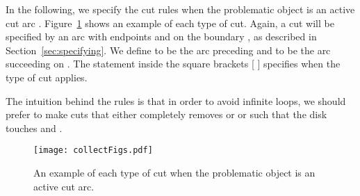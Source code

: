 \documentclass{article}
\begin{document}
In the following, we specify the cut rules when the problematic object is an active cut arc .
Figure~\ref{fig:cuttypesActive} shows an example of each type of cut.
Again, a cut will be specified by an arc  with endpoints  and  on the boundary , as described in Section~\ref{sec:specifying}.
We define  to be the arc preceding  and  to be the arc succeeding  on .
The statement inside the square brackets [ ] specifies when the type of cut applies.

The intuition behind the rules is that in order to avoid infinite loops, we should prefer to make cuts that either completely removes  or  or such that the disk  touches  and .

\begin{figure}
\centering
\texttt{[image: collectFigs.pdf]}
\caption{An example of each type of cut when the problematic object  is an active cut arc.}
\label{fig:cuttypesActive}
\end{figure}
\end{document}
